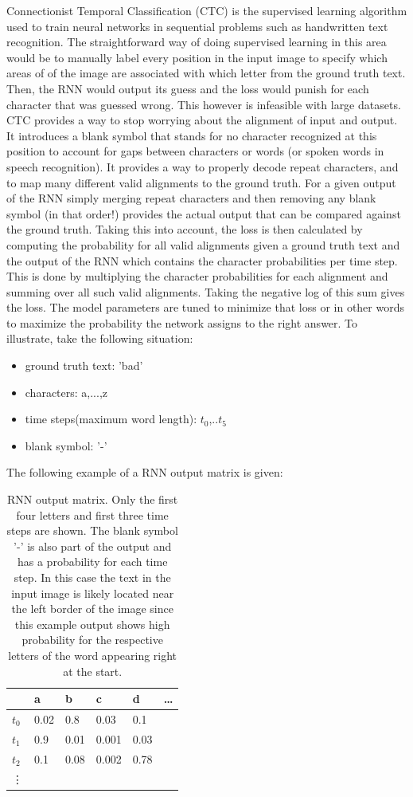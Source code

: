 \documentclass{article}
\begin{document}
Connectionist Temporal Classification (CTC) is the supervised learning algorithm used to train neural networks in sequential problems such as handwritten text recognition\cite{Hannun}. The straightforward way of doing supervised learning in this area would be to manually label every position in the input image to specify which areas of of the image are associated with which letter from the ground truth text. Then, the RNN would output its guess and the loss would punish for each character that was guessed wrong. This however is infeasible with large datasets. CTC provides a way to stop worrying about the alignment of input and output. It introduces a blank symbol that stands for no character recognized at this position to account for gaps between characters or words (or spoken words in speech recognition). It provides a way to properly decode repeat characters, and to map many different valid alignments to the ground truth.
For a given output of the RNN simply merging repeat characters and then removing any blank symbol (in that order!) provides the actual output that can be compared against the ground truth. Taking this into account, the loss is then calculated by computing the probability for all valid alignments given a ground truth text and the output of the RNN which contains the character probabilities per time step. This is done by multiplying the character probabilities for each alignment and summing over all such valid alignments. Taking the negative log of this sum gives the loss. The model parameters are tuned to minimize that loss or in other words to maximize the probability the network assigns to the right answer. To illustrate, take the following situation:
\begin{itemize}
\item ground truth text: 'bad'
\item characters: a,...,z
\item time steps(maximum word length): \(t_0\),..\(t_5\)
\item blank symbol: '-'
\end{itemize}
The following example of a RNN output matrix is given:
\begin{table}[H]
\centering
\begin{tabular}{l|l|l|l|l|l}
\label{tab:SampleRNNOutput}
       & a & b & c & d &\ldots \\ \hline
\(t_0\) & 0.02 & 0.8 & 0.03 & 0.1 & \\ \hline
\(t_1\) & 0.9 & 0.01 & 0.001 & 0.03 & \\ \hline
\(t_2\) & 0.1 & 0.08 & 0.002 & 0.78 & \\ \hline
\vdots       &         &         &         & 
\end{tabular}
\caption{RNN output matrix. Only the first four letters and first three time steps are shown. The blank  symbol '-' is also part of the output and has a probability for each time step. In this case the text in the input image is likely located near the left border of the image since this example output shows high probability for the respective letters of the word appearing right at the start.}
\end{table}
\end{document}
